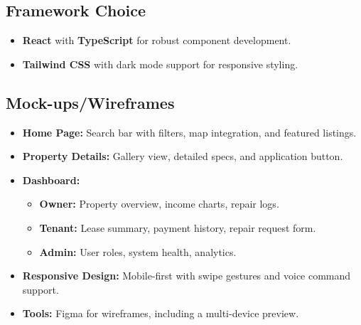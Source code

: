 \documentclass[12pt]{article}
\begin{document}
\subsection{Framework Choice}
\begin{itemize}
    \item \textbf{React} with \textbf{TypeScript} for robust component development.
    \item \textbf{Tailwind CSS} with dark mode support for responsive styling.
\end{itemize}

\subsection{Mock-ups/Wireframes}
\begin{itemize}
    \item \textbf{Home Page:} Search bar with filters, map integration, and featured listings.
    \item \textbf{Property Details:} Gallery view, detailed specs, and application button.
    \item \textbf{Dashboard:}
    \begin{itemize}
        \item \textbf{Owner:} Property overview, income charts, repair logs.
        \item \textbf{Tenant:} Lease summary, payment history, repair request form.
        \item \textbf{Admin:} User roles, system health, analytics.
    \end{itemize}
    \item \textbf{Responsive Design:} Mobile-first with swipe gestures and voice command support.
    \item \textbf{Tools:} Figma for wireframes, including a multi-device preview.
\end{itemize}
\end{document}
